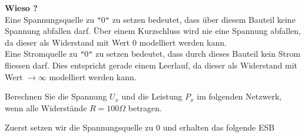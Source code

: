 																				 \textbf{Wieso ?} \\
																				 Eine Spannungsquelle zu \texttt{"}0\texttt{"} zu setzen bedeutet, dass über diesem Bauteil keine Spannung abfallen darf. Über einem Kurzschluss wird nie eine Spannung abfallen, da dieser als Widerstand mit Wert 0 modelliert werden kann. \\
																				 Eine Stromquelle zu \texttt{"}0\texttt{"} zu setzen bedeutet, dass durch dieses Bauteil kein Strom fliessen darf. Dies entspricht gerade einem Leerlauf, da dieser als Widerstand mit Wert $\displaystyle \rightarrow \infty$ modelliert werden kann. \\

\newpage


																				 \beginbsp
																				Berechnen Sie die Spannung $U_x$ und die Leistung $P_x$ im folgenden Netzwerk, wenn alle Widerstände $ R = 100 \Omega$ betragen. \\
																					\begin{center}
																						\fix
																					\end{center}
																					\iend
																					\newpage
																					\beginbsp
																					Zuerst setzen wir die Spannungsquelle zu 0 und erhalten das folgende ESB \\
																					\begin{center}
																						\fix
																					\end{center}

